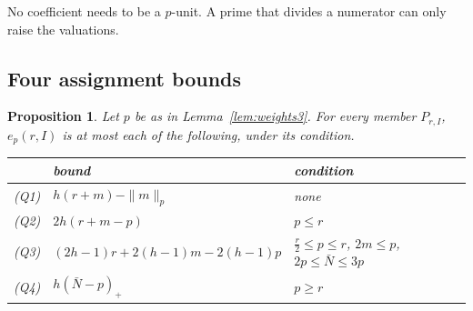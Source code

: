 \documentclass[11pt]{amsart}
\newtheorem{proposition}[theorem]{Proposition}
\theoremstyle{definition}
\theoremstyle{remark}
\numberwithin{equation}{section}
\begin{document}
No coefficient needs to be a $p$-unit. A prime that divides a numerator can only raise the valuations.

\subsection{Four assignment bounds}
\begin{proposition}\label{prop:rows3}
Let $p$ be as in Lemma~\ref{lem:weights3}. For every member $P_{r,I}$, $e_p(r,I)$ is at most each of the following,
under its condition.
\begin{center}
{\renewcommand{\arraystretch}{1.2}\setlength{\tabcolsep}{3pt}
\begin{tabular}{@{}lll@{}}
\toprule
 & bound & condition\\
\midrule
(Q1) & $h(r+m)-\|m\|_p$ & none\\
(Q2) & $2h(r+m-p)$ & $p\le r$\\
(Q3) & $(2h-1)r+2(h-1)m-2(h-1)p$ & $\frac r2\le p\le r$, $2m\le p$, $2p\le\bar N\le3p$\\
(Q4) & $h(\bar N-p)_+$ & $p\ge r$\\
\bottomrule
\end{tabular}}
\end{center}
\end{proposition}
\end{document}
